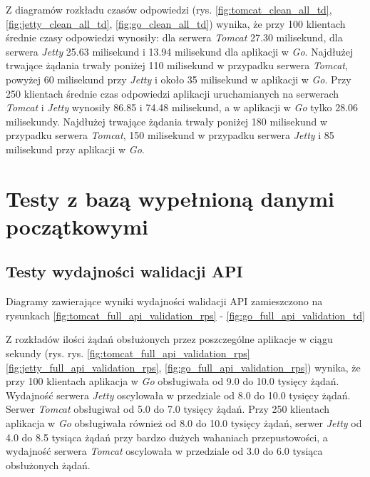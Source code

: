 Z diagramów rozkładu czasów odpowiedzi (rys. \ref{fig:tomcat_clean_all_td}, \ref{fig:jetty_clean_all_td}, \ref{fig:go_clean_all_td}) wynika, że przy 100 klientach średnie czasy odpowiedzi wynosiły: dla serwera \textsl{Tomcat} 27.30  milisekund, dla serwera \textsl{Jetty} 25.63 milisekund i 13.94 milisekund dla aplikacji w \textsl{Go}.  Najdłużej trwające żądania trwały poniżej 110 milisekund w przypadku serwera \textsl{Tomcat}, powyżej 60 milisekund przy \textsl{Jetty} i około 35 milisekund  w aplikacji w \textsl{Go}. Przy 250 klientach średnie czas odpowiedzi aplikacji uruchamianych na serwerach \textsl{Tomcat} i \textsl{Jetty} wynosiły 86.85 i 74.48 milisekund, a w aplikacji w \textsl{Go} tylko 28.06 milisekundy. Najdłużej trwające żądania trwały poniżej 180 milisekund w przypadku serwera \textsl{Tomcat}, 150 milisekund w przypadku serwera \textsl{Jetty} i 85 milisekund przy aplikacji w \textsl{Go}.

% 
\clearpage

\newpage
\section{Testy z bazą wypełnioną danymi początkowymi}
\subsection{Testy wydajności walidacji API}
Diagramy zawierające wyniki wydajności walidacji API zamieszczono na rysunkach \ref{fig:tomcat_full_api_validation_rps} - \ref{fig:go_full_api_validation_td}

Z rozkładów ilości żądań obsłużonych przez poszczególne aplikacje w ciągu sekundy (rys. rys. \ref{fig:tomcat_full_api_validation_rps} \ref{fig:jetty_full_api_validation_rps}, \ref{fig:go_full_api_validation_rps}) wynika, że przy 100 klientach aplikacja  w \textsl{Go} obsługiwała od 9.0 do 10.0 tysięcy żądań. Wydajność serwera  \textsl{Jetty} oscylowała w przedziale od 8.0 do 10.0 tysięcy żądań. Serwer \textsl{Tomcat} obsługiwał od 5.0 do 7.0 tysięcy żądań. Przy 250 klientach aplikacja w \textsl{Go} obsługiwała również od 8.0 do 10.0 tysięcy żądań, serwer \textsl{Jetty} od 4.0 do 8.5 tysiąca żądań przy bardzo dużych wahaniach przepustowości, a wydajność serwera \textsl{Tomcat} oscylowała w przedziale od 3.0 do 6.0 tysiąca obsłużonych żądań. 
 
